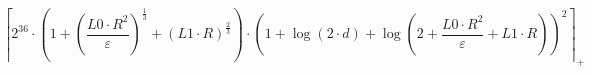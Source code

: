\[\left\lceil 2^{36} \cdot \left(1 + \left(\frac{L0 \cdot R^{2}}{\varepsilon}\right)^{\frac{1}{3}} + \left(L1 \cdot R\right)^{\frac{2}{3}}\right) \cdot \left(1 + \log\left(2 \cdot d\right) + \log\left(2 + \frac{L0 \cdot R^{2}}{\varepsilon} + L1 \cdot R\right)\right)^{2} \right\rceil_{+}\]
